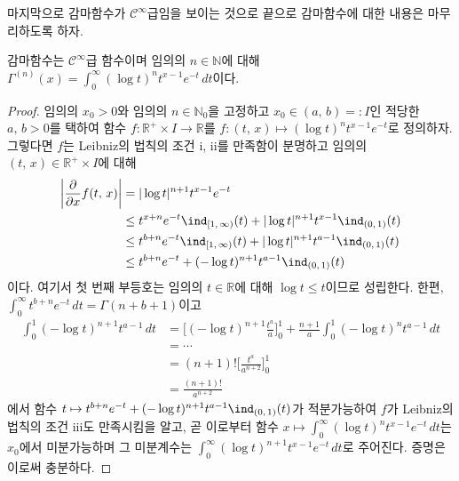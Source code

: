 마지막으로 감마함수가 $\mathcal{C}^\infty$급임을 보이는 것으로 끝으로 감마함수에 대한 내용은 마무리하도록 하자.

\begin{theorem}
    감마함수는 $\mathcal{C}^\infty$급 함수이며 임의의 $n\in\mathbb{N}$에 대해 $\Gamma^{(n)}(x)=\int_0^\infty (\log t)^nt^{x-1}e^{-t}\,dt$이다.
\end{theorem}

\begin{proof}
    임의의 $x_0>0$와 임의의 $n\in\mathbb{N}_0$을 고정하고 $x_0\in(a,\,b)=:I$인 적당한 $a,\,b>0$를 택하여 함수 $f:\mathbb{R}^+\times I\to\mathbb{R}$를 $f:(t,\,x)\mapsto (\log t)^nt^{x-1}e^{-t}$로 정의하자. 그렇다면 $f$는 Leibniz의 법칙의 조건 i, ii를 만족함이 분명하고 임의의 $(t,\,x)\in\mathbb{R}^+\times I$에 대해
    \begin{align*}
        \bigg|\frac{\partial}{\partial x}f(t,\,x)\bigg|&=|\log t|^{n+1}t^{x-1}e^{-t}\\
        &\leq t^{x+n}e^{-t}\ind_{[1,\,\infty)}(t)+|\log t|^{n+1}t^{x-1}\ind_{(0,\,1)}(t)\\
        &\leq t^{b+n}e^{-t}\ind_{[1,\,\infty)}(t)+|\log t|^{n+1}t^{a-1}\ind_{(0,\,1)}(t)\\
        &\leq t^{b+n}e^{-t}+(-\log t)^{n+1}t^{a-1}\ind_{(0,\,1)}(t)
    \end{align*}
    이다. 여기서 첫 번째 부등호는 임의의 $t\in\mathbb{R}$에 대해 $\log t\leq t$이므로 성립한다. 한편, $\int_0^\infty t^{b+n}e^{-t}\,dt=\Gamma(n+b+1)$이고
    \begin{align*}
        \int_0^1(-\log t)^{n+1}t^{a-1}\,dt&=\bigg[(-\log t)^{n+1}\frac{t^a}{a}\bigg]_0^1+\frac{n+1}{a}\int_0^1(-\log t)^nt^{a-1}\,dt\\
        &=\cdots\\
        &=(n+1)!\bigg[\frac{t^a}{a^{n+2}}\bigg]_0^1\\
        &=\frac{(n+1)!}{a^{n+2}}
    \end{align*}
    에서 함수 $t\mapsto t^{b+n}e^{-t}+(-\log t)^{n+1}t^{a-1}\ind_{(0,\,1)}(t)$가 적분가능하여 $f$가 Leibniz의 법칙의 조건 iii도 만족시킴을 알고, 곧 이로부터 함수 $x\mapsto\int_0^\infty (\log t)^nt^{x-1}e^{-t}\,dt$는 $x_0$에서 미분가능하며 그 미분계수는 $\int_0^\infty (\log t)^{n+1}t^{x-1}e^{-t}\,dt$로 주어진다. 증명은 이로써 충분하다.
\end{proof}

